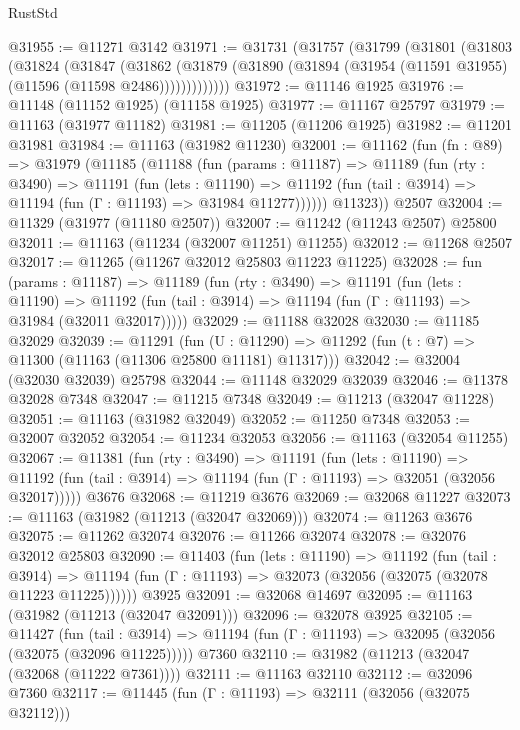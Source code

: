 \begin{lexlean}{RustStd}
\begin{coremodule}
@31955 := @11271 @3142
@31971 := @31731
    (@31757
      (@31799
        (@31801
          (@31803
            (@31824
              (@31847
                (@31862
                  (@31879 (@31890 (@31894 (@31954 (@11591 @31955) (@11596 (@11598 @2486)))))))))))))
@31972 := @11146 @1925
@31976 := @11148 (@11152 @1925) (@11158 @1925)
@31977 := @11167 @25797
@31979 := @11163 (@31977 @11182)
@31981 := @11205 (@11206 @1925)
@31982 := @11201 @31981
@31984 := @11163 (@31982 @11230)
@32001 := @11162
    (fun (fn : @89) =>
    @31979
      (@11185
        (@11188
          (fun (params : @11187) =>
          @11189
            (fun (rty : @3490) =>
            @11191
              (fun (lets : @11190) =>
              @11192 (fun (tail : @3914) => @11194 (fun (Γ : @11193) => @31984 @11277))))))
        @11323))
    @2507
@32004 := @11329 (@31977 (@11180 @2507))
@32007 := @11242 (@11243 @2507) @25800
@32011 := @11163 (@11234 (@32007 @11251) @11255)
@32012 := @11268 @2507
@32017 := @11265 (@11267 @32012 @25803 @11223 @11225)
@32028 := fun (params : @11187) =>
  @11189
    (fun (rty : @3490) =>
    @11191
      (fun (lets : @11190) =>
      @11192 (fun (tail : @3914) => @11194 (fun (Γ : @11193) => @31984 (@32011 @32017)))))
@32029 := @11188 @32028
@32030 := @11185 @32029
@32039 := @11291
    (fun (U : @11290) => @11292 (fun (t : @7) => @11300 (@11163 (@11306 @25800 @11181) @11317)))
@32042 := @32004 (@32030 @32039) @25798
@32044 := @11148 @32029 @32039
@32046 := @11378 @32028 @7348
@32047 := @11215 @7348
@32049 := @11213 (@32047 @11228)
@32051 := @11163 (@31982 @32049)
@32052 := @11250 @7348
@32053 := @32007 @32052
@32054 := @11234 @32053
@32056 := @11163 (@32054 @11255)
@32067 := @11381
    (fun (rty : @3490) =>
    @11191
      (fun (lets : @11190) =>
      @11192 (fun (tail : @3914) => @11194 (fun (Γ : @11193) => @32051 (@32056 @32017)))))
    @3676
@32068 := @11219 @3676
@32069 := @32068 @11227
@32073 := @11163 (@31982 (@11213 (@32047 @32069)))
@32074 := @11263 @3676
@32075 := @11262 @32074
@32076 := @11266 @32074
@32078 := @32076 @32012 @25803
@32090 := @11403
    (fun (lets : @11190) =>
    @11192
      (fun (tail : @3914) =>
      @11194 (fun (Γ : @11193) => @32073 (@32056 (@32075 (@32078 @11223 @11225))))))
    @3925
@32091 := @32068 @14697
@32095 := @11163 (@31982 (@11213 (@32047 @32091)))
@32096 := @32078 @3925
@32105 := @11427
    (fun (tail : @3914) => @11194 (fun (Γ : @11193) => @32095 (@32056 (@32075 (@32096 @11225)))))
    @7360
@32110 := @31982 (@11213 (@32047 (@32068 (@11222 @7361))))
@32111 := @11163 @32110
@32112 := @32096 @7360
@32117 := @11445 (fun (Γ : @11193) => @32111 (@32056 (@32075 @32112)))

\end{coremodule}
\end{lexlean}
